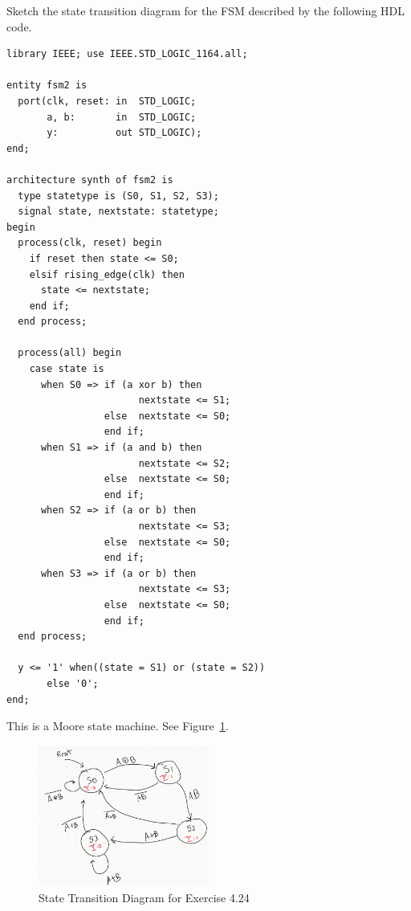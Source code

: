 \documentclass[12pt]{article}
\newenvironment{ex}[2][Exercise]{\begin{trivlist}
		\item[\hskip \labelsep {\bfseries #1}\hskip \labelsep {\bfseries #2.}]}{\end{trivlist}}
\newenvironment{sol}[1][Solution]{\begin{trivlist}
		\item[\hskip \labelsep {\bfseries #1:}]}{\end{trivlist}}
\begin{document}
\begin{ex}{4.24}
	Sketch the state transition diagram for the FSM described by the following HDL code.
	\begin{lstlisting}
library IEEE; use IEEE.STD_LOGIC_1164.all;

entity fsm2 is
  port(clk, reset: in  STD_LOGIC;
       a, b:       in  STD_LOGIC;
       y:          out STD_LOGIC);
end;

architecture synth of fsm2 is
  type statetype is (S0, S1, S2, S3);
  signal state, nextstate: statetype;
begin
  process(clk, reset) begin
    if reset then state <= S0;
    elsif rising_edge(clk) then
      state <= nextstate;
    end if;
  end process;
  
  process(all) begin
    case state is
      when S0 => if (a xor b) then
                       nextstate <= S1;
                 else  nextstate <= S0;
                 end if;
      when S1 => if (a and b) then
      				   nextstate <= S2;
      		     else  nextstate <= S0;
      			 end if;
      when S2 => if (a or b) then
					   nextstate <= S3;
				 else  nextstate <= S0;
				 end if;
      when S3 => if (a or b) then
				 	   nextstate <= S3;
				 else  nextstate <= S0;
				 end if;
  end process;
  
  y <= '1' when((state = S1) or (state = S2))
       else '0';
end;
	\end{lstlisting}
\end{ex}

\begin{sol}
	This is a Moore state machine. See Figure~\ref{04-24-state-transition-diagram}.
	\begin{figure}
		\centering
		\includegraphics[width=0.5\textwidth]{04-24-state-transition-diagram}
		\caption{State Transition Diagram for Exercise 4.24}
		\label{04-24-state-transition-diagram}
	\end{figure}
\end{sol}
\end{document}
